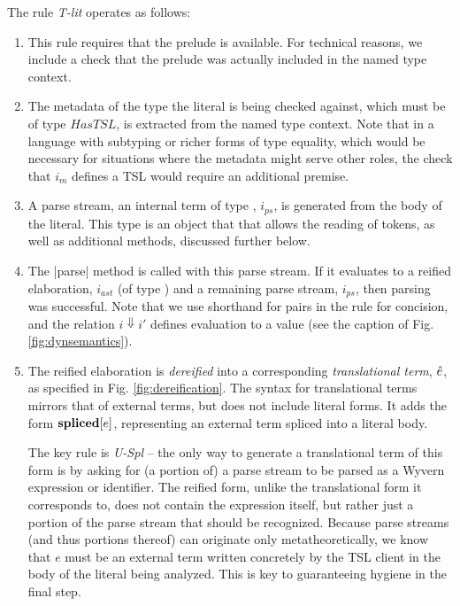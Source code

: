\noindent
The rule \textit{T-lit} operates as follows:
\begin{enumerate}
\setlength{\itemsep}{1pt}
\item This rule requires that the prelude is available. For technical reasons, we include a check that the prelude was actually included in the named type context.
\item The metadata of the type the literal is being checked against, which must be of type $HasTSL$, is extracted from the named type context. Note that in a language with subtyping or richer forms of type equality, which would be necessary for situations where the metadata might serve other roles, the check that $i_m$ defines a TSL would require an additional premise. 
\item A parse stream, an internal term of type , $i_{ps}$, is generated from the body of the literal. This type is an object that that allows the reading of tokens, as well as additional methods, discussed further below.
\item The \li|parse| method is called with this parse stream. If it evaluates to a reified elaboration, $i_{ast}$ (of type ) and a remaining parse stream, $i_{ps}$, then parsing was successful. Note that we use shorthand for pairs in the rule for concision, and the relation $i \Downarrow i'$ defines evaluation to a value (see the caption of Fig. \ref{fig:dynsemantics}).
\item The reified elaboration is \emph{dereified} into a corresponding \emph{translational term}, $\hat{e}$, as specified in Fig. \ref{fig:dereification}. The syntax for translational terms mirrors that of external terms, but does not include literal forms. It adds the form $\textbf{spliced}[e]$, representing an external term  spliced into a literal body. 

The key rule is \textit{U-Spl} -- the only way to generate a translational term of this form is by asking for (a portion of) a parse stream to be parsed as a Wyvern expression or identifier. The reified form, unlike the translational form it corresponds to, does not contain the expression itself, but rather just a portion of the parse stream that should be recognized. Because parse streams (and thus portions thereof) can originate only metatheoretically, we know that $e$ must be an external term written concretely by the TSL client in the body of the literal being analyzed. This is key to guaranteeing hygiene in the final step.


\end{enumerate}

